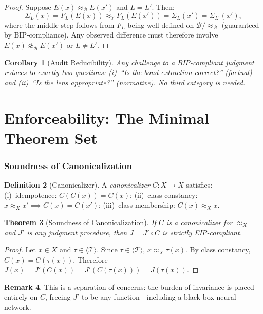 \documentclass[12pt,letterpaper]{article}
\newtheorem{theorem}{Theorem}[section]
\newtheorem{corollary}[theorem]{Corollary}
\theoremstyle{definition}
\newtheorem{definition}[theorem]{Definition}
\newtheorem{remark}[theorem]{Remark}
\theoremstyle{plain}
\newcommand{\calB}{\mathcal{B}}
\newcommand{\genT}{\langle \mathcal{T} \rangle}
\newcommand{\equivX}{\approx_X}
\newcommand{\equivY}{\approx_Y}
\newcommand{\equivB}{\approx_{\mathcal{B}}}
\begin{document}
\begin{proof}
Suppose $E(x) \equivB E(x')$ and $L = L'$. Then:
\[
\Sigma_L(x) = F_L(E(x)) \equivY F_L(E(x')) = \Sigma_L(x') = \Sigma_{L'}(x'),
\]
where the middle step follows from $F_L$ being well-defined on $\calB / \equivB$ (guaranteed by BIP-compliance). Any observed difference must therefore involve $E(x) \not\equivB E(x')$ or $L \neq L'$.
\end{proof}

\begin{corollary}[Audit Reducibility]
Any challenge to a BIP-compliant judgment reduces to exactly two questions: (i)~``Is the bond extraction correct?'' (factual) and (ii)~``Is the lens appropriate?'' (normative). No third category is needed.
\end{corollary}


\part{Enforceability: The Minimal Theorem Set}
\label{part:theorems}

\section{Soundness of Canonicalization}
\label{sec:thm-canon}

\begin{definition}[Canonicalizer]
A \emph{canonicalizer} $C: X \to X$ satisfies: (i)~idempotence: $C(C(x)) = C(x)$; (ii)~class constancy: $x \equivX x' \implies C(x) = C(x')$; (iii)~class membership: $C(x) \equivX x$.
\end{definition}

\begin{theorem}[Soundness of Canonicalization]
\label{thm:canon-sound}
If $C$ is a canonicalizer for $\equivX$ and $J'$ is any judgment procedure, then $J = J' \circ C$ is strictly EIP-compliant.
\end{theorem}

\begin{proof}
Let $x \in X$ and $\tau \in \genT$. Since $\tau \in \genT$, $x \equivX \tau(x)$. By class constancy, $C(x) = C(\tau(x))$. Therefore $J(x) = J'(C(x)) = J'(C(\tau(x))) = J(\tau(x))$.
\end{proof}

\begin{remark}
This is a separation of concerns: the burden of invariance is placed entirely on $C$, freeing $J'$ to be any function---including a black-box neural network.
\end{remark}
\end{document}
